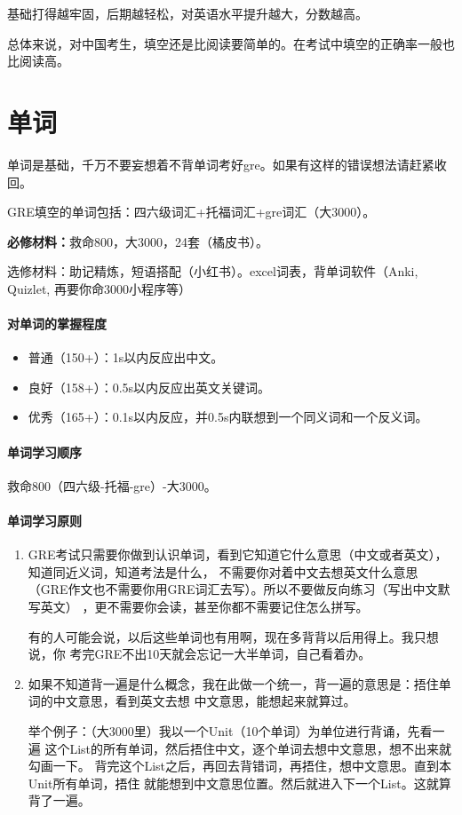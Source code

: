 \documentclass[cn,plain]{./src/qyxfbook}
\newenvironment{material}{\begin{tcolorbox}[title={材料}]}{\end{tcolorbox}}
\begin{document}
基础打得越牢固，后期越轻松，对英语水平提升越大，分数越高。

总体来说，对中国考生，填空还是比阅读要简单的。在考试中填空的正确率一般也比阅读高。

\section{单词}
单词是基础，千万不要妄想着不背单词考好gre。如果有这样的错误想法请赶紧收回。

GRE填空的单词包括：四六级词汇+托福词汇+gre词汇（大3000）。

\begin{material}
\textbf{必修材料：}救命800，大3000，24套（橘皮书）。

选修材料：助记精炼，短语搭配（小红书）。excel词表，背单词软件（Anki,
Quizlet, 再要你命3000小程序等）
\end{material}

\paragraph{对单词的掌握程度}
\begin{itemize}
\item 普通（150+）：1s以内反应出中文。
\item 良好（158+）：0.5s以内反应出英文关键词。
\item 优秀（165+）：0.1s以内反应，并0.5s内联想到一个同义词和一个反义词。
\end{itemize}

\paragraph{单词学习顺序}
救命800（四六级-托福-gre）-大3000。

\paragraph{单词学习原则}
\begin{enumerate}
\item GRE考试只需要你做到认识单词，看到它知道它什么意思（中文或者英文），知道同近义词，知道考法是什么，
不需要你对着中文去想英文什么意思（GRE作文也不需要你用GRE词汇去写）。所以不要做反向练习（写出中文默写英文）
，更不需要你会读，甚至你都不需要记住怎么拼写。

有的人可能会说，以后这些单词也有用啊，现在多背背以后用得上。我只想说，你
考完GRE不出10天就会忘记一大半单词，自己看着办。

\item 如果不知道背一遍是什么概念，我在此做一个统一，背一遍的意思是：捂住单词的中文意思，看到英文去想
中文意思，能想起来就算过。

举个例子：（大3000里）我以一个Unit（10个单词）为单位进行背诵，先看一遍
这个List的所有单词，然后捂住中文，逐个单词去想中文意思，想不出来就勾画一下。
背完这个List之后，再回去背错词，再捂住，想中文意思。直到本Unit所有单词，捂住
就能想到中文意思位置。然后就进入下一个List。这就算背了一遍。
\end{enumerate}
\end{document}
